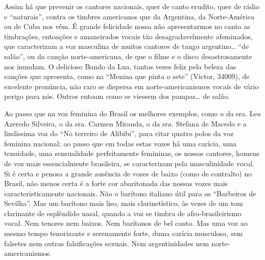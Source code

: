 Assim há que prevenir os cantores nacionais, quer de canto erudito, quer
de rádio e ``naturais'', contra os timbres americanos que da Argentina,
da Norte-América ou de Cuba nos vêm. É grande felicidade nossa não
apresentarmos no canto as timbrações, entoações e amaneirados vocais tão
desagradavelmente afeminados, que caracterizam a voz masculina de muitos
cantores de tango argentino\ldots{} ``de salão'', ou da canção
norte-americana, de que o filme e o disco desastrosamente nos inundam. O
delicioso Bando da Lua, tantas vezes feliz pela beleza das canções que
apresenta, como na ``Menina que pinta o sete'' (Victor, 34009), de
excelente pronúncia, não raro se dispersa em norte-americanismos vocais
de vário perigo para nós. Outros entoam como se viessem dos pampas\ldots{} de
salão.

Ao passo que na voz feminina do Brasil os melhores exemplos, como o da
sra. Lea Azeredo Silveira, o da sra. Carmen Miranda, o da sra. Stefana
de Macedo e a lindíssima voz do ``No terreiro de Alibibi'', para citar
quatro polos da voz feminina nacional; ao passo que em todas estas vozes
há uma carícia, uma tenuidade, uma sensualidade perfeitamente femininas,
os nossos cantores, homens de voz mais essencialmente brasileira, se
caracterizam pela masculinidade vocal. Si é certa e penosa a grande
ausência de vozes de baixo (como de contralto) no Brasil, não menos
certa é a forte cor abaritonada das nossas vozes mais
caracteristicamente nacionais. Não o barítono italiano útil para os
``Barbeiros de Sevilha''. Mas um barítono mais liso, mais
clarinetístico, às vezes de um tom clarinante de esplêndido nasal,
quando a voz se timbra de afro-brasileirismo vocal. Nem tenores nem
baixos. Nem barítonos de bel canto. Mas uma voz ao mesmo tempo
tenorizante e serenamente forte, duma carícia musculosa, sem falsetes
nem outras falsificações sexuais. Nem argentinidades nem
norte-americanismos.

